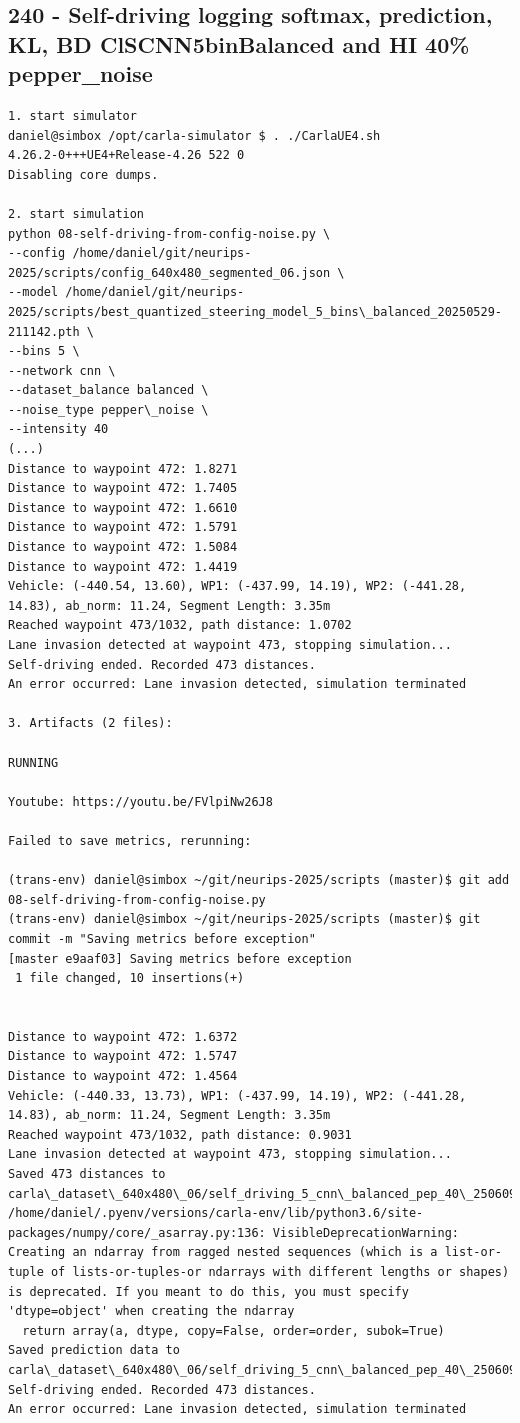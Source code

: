 \subsection{240 - Self-driving logging softmax, prediction, KL, BD ClSCNN5binBalanced and HI 40\% pepper\_noise}
\label{app_res:240}

\begin{verbatim}
1. start simulator
daniel@simbox /opt/carla-simulator $ . ./CarlaUE4.sh 
4.26.2-0+++UE4+Release-4.26 522 0
Disabling core dumps.

2. start simulation
python 08-self-driving-from-config-noise.py \
--config /home/daniel/git/neurips-2025/scripts/config_640x480_segmented_06.json \
--model /home/daniel/git/neurips-2025/scripts/best_quantized_steering_model_5_bins\_balanced_20250529-211142.pth \
--bins 5 \
--network cnn \
--dataset_balance balanced \
--noise_type pepper\_noise \
--intensity 40   
(...)
Distance to waypoint 472: 1.8271
Distance to waypoint 472: 1.7405
Distance to waypoint 472: 1.6610
Distance to waypoint 472: 1.5791
Distance to waypoint 472: 1.5084
Distance to waypoint 472: 1.4419
Vehicle: (-440.54, 13.60), WP1: (-437.99, 14.19), WP2: (-441.28, 14.83), ab_norm: 11.24, Segment Length: 3.35m
Reached waypoint 473/1032, path distance: 1.0702
Lane invasion detected at waypoint 473, stopping simulation...
Self-driving ended. Recorded 473 distances.
An error occurred: Lane invasion detected, simulation terminated

3. Artifacts (2 files):

RUNNING

Youtube: https://youtu.be/FVlpiNw26J8

Failed to save metrics, rerunning:

(trans-env) daniel@simbox ~/git/neurips-2025/scripts (master)$ git add  08-self-driving-from-config-noise.py 
(trans-env) daniel@simbox ~/git/neurips-2025/scripts (master)$ git commit -m "Saving metrics before exception"
[master e9aaf03] Saving metrics before exception
 1 file changed, 10 insertions(+)


Distance to waypoint 472: 1.6372
Distance to waypoint 472: 1.5747
Distance to waypoint 472: 1.4564
Vehicle: (-440.33, 13.73), WP1: (-437.99, 14.19), WP2: (-441.28, 14.83), ab_norm: 11.24, Segment Length: 3.35m
Reached waypoint 473/1032, path distance: 0.9031
Lane invasion detected at waypoint 473, stopping simulation...
Saved 473 distances to carla\_dataset\_640x480\_06/self_driving_5_cnn\_balanced_pep_40\_250609_2056.txt
/home/daniel/.pyenv/versions/carla-env/lib/python3.6/site-packages/numpy/core/_asarray.py:136: VisibleDeprecationWarning: Creating an ndarray from ragged nested sequences (which is a list-or-tuple of lists-or-tuples-or ndarrays with different lengths or shapes) is deprecated. If you meant to do this, you must specify 'dtype=object' when creating the ndarray
  return array(a, dtype, copy=False, order=order, subok=True)
Saved prediction data to carla\_dataset\_640x480\_06/self_driving_5_cnn\_balanced_pep_40\_250609_2056.npy
Self-driving ended. Recorded 473 distances.
An error occurred: Lane invasion detected, simulation terminated



\end{verbatim}
